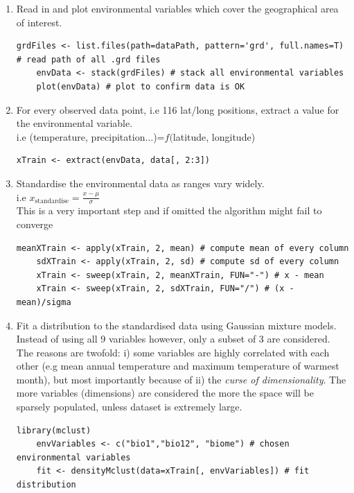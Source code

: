 \documentclass[a4paper,11pt]{article}
\begin{document}
\clearpage

\begin{enumerate}
	\item Read in and plot environmental variables which cover the geographical area of interest.
	\\
	\begin{lstlisting}[style=RCode]
	grdFiles <- list.files(path=dataPath, pattern='grd', full.names=T) # read path of all .grd files
	envData <- stack(grdFiles) # stack all environmental variables
	plot(envData) # plot to confirm data is OK
	\end{lstlisting}
	\vspace{-0.6cm}

	\item For every observed data point, i.e 116 lat/long positions, extract a value for the environmental variable.\\
	i.e (temperature, precipitation$\ldots$)=$f($latitude, longitude)
	\\
	\begin{lstlisting}[style=RCode]
	xTrain <- extract(envData, data[, 2:3]) 
	\end{lstlisting}
	\vspace{-0.6cm}

	\item Standardise the environmental data as ranges vary widely.\\ 
	i.e $x_{\mathrm{standardise}} = \frac{x-\mu}{\sigma}$\\
	This is a very important step and if omitted the algorithm might fail to converge
	\\
	\begin{lstlisting}[style=RCode]
	meanXTrain <- apply(xTrain, 2, mean) # compute mean of every column
	sdXTrain <- apply(xTrain, 2, sd) # compute sd of every column
	xTrain <- sweep(xTrain, 2, meanXTrain, FUN="-") # x - mean
	xTrain <- sweep(xTrain, 2, sdXTrain, FUN="/") # (x - mean)/sigma
	\end{lstlisting}
	\vspace{-0.6cm}

	\item Fit a distribution to the standardised data using Gaussian mixture models. Instead of using all 9 variables
	however, only a subset of 3 are considered. The reasons are twofold: i) some variables are highly correlated with each other
	(e.g mean annual temperature and maximum temperature of warmest month), but most importantly because of ii) the \textit{curse of dimensionality}.
	The more variables (dimensions) are considered the more the space will be sparsely populated, unless dataset is extremely large. 
	\\
	\begin{lstlisting}[style=RCode]
	library(mclust)
	envVariables <- c("bio1","bio12", "biome") # chosen environmental variables
	fit <- densityMclust(data=xTrain[, envVariables]) # fit distribution
	\end{lstlisting}
	\vspace{-0.6cm}


\end{enumerate}
\end{document}
